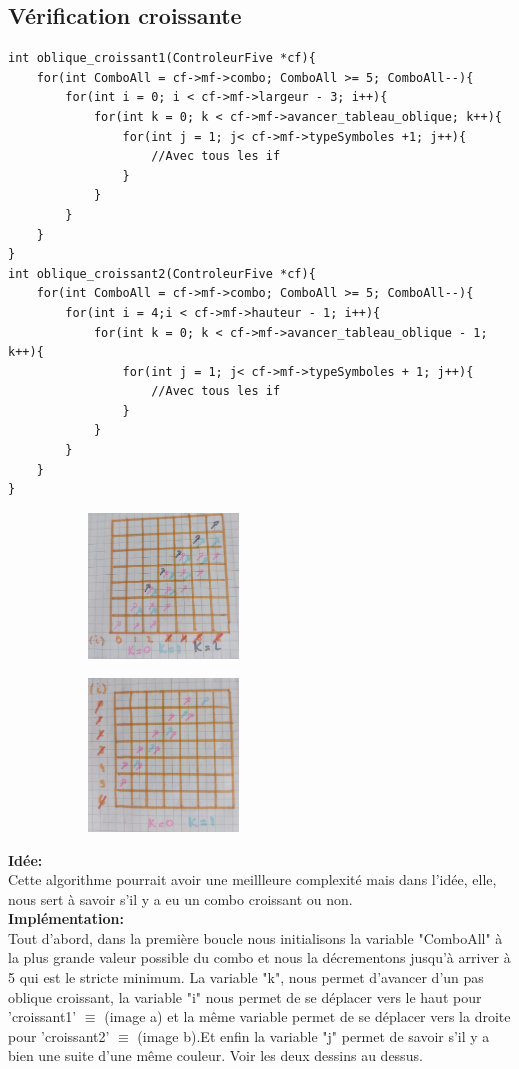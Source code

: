 \documentclass[a4paper, 11pt, oneside]{article}
\begin{document}
\subsection{Vérification croissante}
\begin{lstlisting}
int oblique_croissant1(ControleurFive *cf){
    for(int ComboAll = cf->mf->combo; ComboAll >= 5; ComboAll--){
        for(int i = 0; i < cf->mf->largeur - 3; i++){ 
            for(int k = 0; k < cf->mf->avancer_tableau_oblique; k++){
                for(int j = 1; j< cf->mf->typeSymboles +1; j++){
                    //Avec tous les if
                }
            }
        }
    }
}
int oblique_croissant2(ControleurFive *cf){
    for(int ComboAll = cf->mf->combo; ComboAll >= 5; ComboAll--){
        for(int i = 4;i < cf->mf->hauteur - 1; i++){
            for(int k = 0; k < cf->mf->avancer_tableau_oblique - 1; k++){
                for(int j = 1; j< cf->mf->typeSymboles + 1; j++){
                    //Avec tous les if
                }
            }
        }
    }
}
\end{lstlisting}
\begin{figure}[!h]
    \centering
    \begin{subfigure}[]{}
        \includegraphics[width=4cm]{./images/croissant1.jpg}
    \end{subfigure}
    \begin{subfigure}[]{}
        \includegraphics[width=4cm]{./images/croissant2.jpg}
    \end{subfigure}
\end{figure}
    
\textbf{Idée:}\\
Cette algorithme pourrait avoir une meillleure complexité mais dans l'idée, elle, nous sert à savoir s'il y a eu un combo croissant ou non.
\\
\textbf{Implémentation:}\\
Tout d'abord, dans la première boucle nous initialisons la variable "ComboAll" à la plus grande valeur possible du combo et nous la décrementons jusqu'à arriver à 5 qui est le stricte minimum.
La variable "k", nous permet d'avancer d'un pas oblique croissant, la variable "i" nous permet de se déplacer vers le haut pour 'croissant1' $\equiv$ (image a) et la même variable permet de se déplacer vers la droite pour 'croissant2' $\equiv$ (image b).Et enfin la variable "j" permet de savoir s'il y a bien une suite d'une même couleur.
Voir les deux dessins au dessus.
\end{document}
